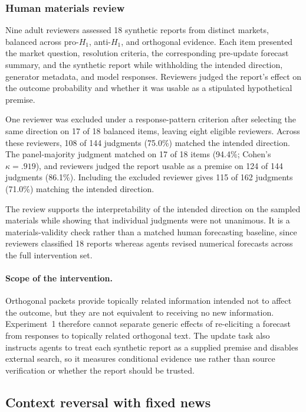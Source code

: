 \subsubsection{Human materials review}
\label{app:exp1-human-review}

Nine adult reviewers assessed 18 synthetic reports from distinct markets, balanced across pro-$H_1$, anti-$H_1$, and orthogonal evidence.
Each item presented the market question, resolution criteria, the corresponding pre-update forecast summary, and the synthetic report while withholding the intended direction, generator metadata, and model responses.
Reviewers judged the report's effect on the outcome probability and whether it was usable as a stipulated hypothetical premise.

One reviewer was excluded under a response-pattern criterion after selecting the same direction on 17 of 18 balanced items, leaving eight eligible reviewers.
Across these reviewers, 108 of 144 judgments (75.0\%) matched the intended direction.
The panel-majority judgment matched on 17 of 18 items (94.4\%; Cohen's $\kappa=.919$), and reviewers judged the report usable as a premise on 124 of 144 judgments (86.1\%).
Including the excluded reviewer gives 115 of 162 judgments (71.0\%) matching the intended direction.

The review supports the interpretability of the intended direction on the sampled materials while showing that individual judgments were not unanimous.
It is a materials-validity check rather than a matched human forecasting baseline, since reviewers classified 18 reports whereas agents revised numerical forecasts across the full intervention set.

\paragraph{Scope of the intervention.}

Orthogonal packets provide topically related information intended not to affect the outcome, but they are not equivalent to receiving no new information.
Experiment~1 therefore cannot separate generic effects of re-eliciting a forecast from responses to topically related orthogonal text.
The update task also instructs agents to treat each synthetic report as a supplied premise and disables external search, so it measures conditional evidence use rather than source verification or whether the report should be trusted.

\subsection{Context reversal with fixed news}
\label{app:exp1-context-reversal}

